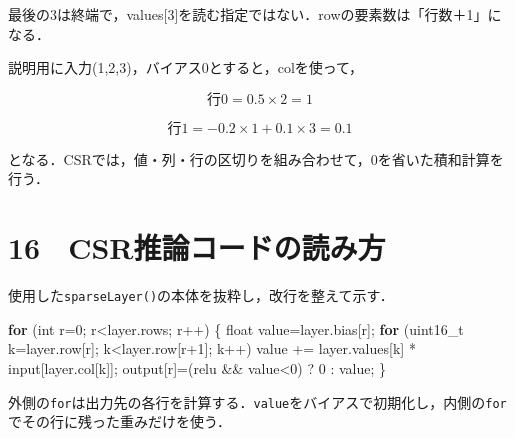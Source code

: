 \documentclass[
  14pt,
  a5paper,
]{extarticle}
\newenvironment{Shaded}{}{}
\newcommand{\ControlFlowTok}[1]{\textcolor[rgb]{0.00,0.44,0.13}{\textbf{#1}}}
\newcommand{\DataTypeTok}[1]{\textcolor[rgb]{0.56,0.13,0.00}{#1}}
\newcommand{\DecValTok}[1]{\textcolor[rgb]{0.25,0.63,0.44}{#1}}
\newcommand{\NormalTok}[1]{#1}
\newcommand{\OperatorTok}[1]{\textcolor[rgb]{0.40,0.40,0.40}{#1}}
\begin{document}
最後の3は終端で，values{[}3{]}を読む指定ではない．rowの要素数は「行数＋1」になる．

説明用に入力(1,2,3)，バイアス0とすると，colを使って，

\[\text{行0}=0.5\times2=1\]

\[\text{行1}=-0.2\times1+0.1\times3=0.1\]

となる．CSRでは，値・列・行の区切りを組み合わせて，0を省いた積和計算を行う．

\newpage

\section{16　CSR推論コードの読み方}\label{csrux63a8ux8ad6ux30b3ux30fcux30c9ux306eux8aadux307fux65b9}

使用した\texttt{sparseLayer()}の本体を抜粋し，改行を整えて示す．

\begin{Shaded}
\begin{Highlighting}[]
\ControlFlowTok{for} \OperatorTok{(}\DataTypeTok{int}\NormalTok{ r}\OperatorTok{=}\DecValTok{0}\OperatorTok{;}\NormalTok{ r}\OperatorTok{\textless{}}\NormalTok{layer}\OperatorTok{.}\NormalTok{rows}\OperatorTok{;}\NormalTok{ r}\OperatorTok{++)} \OperatorTok{\{}
  \DataTypeTok{float}\NormalTok{ value}\OperatorTok{=}\NormalTok{layer}\OperatorTok{.}\NormalTok{bias}\OperatorTok{[}\NormalTok{r}\OperatorTok{];}
  \ControlFlowTok{for} \OperatorTok{(}\DataTypeTok{uint16\_t}\NormalTok{ k}\OperatorTok{=}\NormalTok{layer}\OperatorTok{.}\NormalTok{row}\OperatorTok{[}\NormalTok{r}\OperatorTok{];}
\NormalTok{       k}\OperatorTok{\textless{}}\NormalTok{layer}\OperatorTok{.}\NormalTok{row}\OperatorTok{[}\NormalTok{r}\OperatorTok{+}\DecValTok{1}\OperatorTok{];}\NormalTok{ k}\OperatorTok{++)}
\NormalTok{    value }\OperatorTok{+=}\NormalTok{ layer}\OperatorTok{.}\NormalTok{values}\OperatorTok{[}\NormalTok{k}\OperatorTok{]}
           \OperatorTok{*}\NormalTok{ input}\OperatorTok{[}\NormalTok{layer}\OperatorTok{.}\NormalTok{col}\OperatorTok{[}\NormalTok{k}\OperatorTok{]];}
\NormalTok{  output}\OperatorTok{[}\NormalTok{r}\OperatorTok{]=(}\NormalTok{relu }\OperatorTok{\&\&}\NormalTok{ value}\OperatorTok{\textless{}}\DecValTok{0}\OperatorTok{)}
          \OperatorTok{?} \DecValTok{0} \OperatorTok{:}\NormalTok{ value}\OperatorTok{;}
\OperatorTok{\}}
\end{Highlighting}
\end{Shaded}

外側の\texttt{for}は出力先の各行を計算する．\texttt{value}をバイアスで初期化し，内側の\texttt{for}でその行に残った重みだけを使う．
\end{document}
